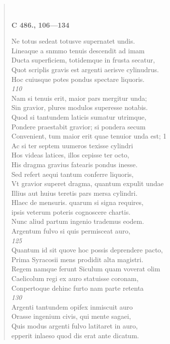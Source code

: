 \documentclass[11pt, a4paper]{report}
\begin{document}
\begin{verse}
        ﻿\pagebreak 
     \marginpar{[34]} \begin{center} \textbf{C 486., 106—134} \end{center}Ne totus sedeat totusve supernatet undis. \\ Lineaque a snmmo tenuis descendit ad imam \\ Ducta superficiem, totidemque in frusta secatur, \\ Quot scriplis gravis est argenti aerisve cylinudrus. \\ Hoc cuiusque potes pondus spectare liquoris. \\ \textit{110} \\ Nam si tenuis erit, maior pars mergitur unda; \\ Sin gravior, plures modulos superesse notabis. \\ Quod si tantundem laticis sumatur utrimque, \\ Pondere praestabit gravior; si pondera secum \\ Convenient, tum maior erit quae tenuior unda est; 1 \\ Ac si ter septem uumeros texisse cylindri \\ Hos videas latices, illos cepisse ter octo, \\ His dragma gravius fatearis pondus inesse. \\ Sed refert aequi tantum conferre liquoris, \\ Vt gravior superet dragma, quantum expulit undae \\ Illius aut huius teretis pars mersa cylindri. \\ Hlaec de mensuris. quarum si signa requires, \\ ipsis veterum poteris cognoscere chartis. \\ Nunc aliud partum ingenio trademus eodem. \\ Argentum fulvo si quis permisceat auro, \\ \textit{125} \\ Quantum id sit quove hoc possis deprendere pacto, \\ Prima Syracosii mens prodidit alta magistri. \\ Regem namque ferunt Siculum quam voverat olim \\ Caelicolum regi ex auro statuisse coronam, \\ Conpertoque dehinc furto nam parte retenta \\ \textit{130} \\ Argenti tantundem opifex inmiscuit auro \\ Orasse ingenium civis, qui mente sagaei, \\ Quis modus argenti fulvo latitaret in auro, \\ epperit inlaeso quod dis erat ante dicatum. \\ 

\end{verse}
\end{document}
